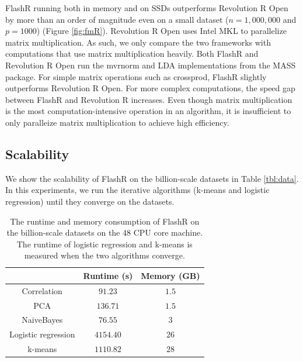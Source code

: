 FlashR running both in memory and on SSDs outperforms Revolution R Open by more
than an order of magnitude even on a small dataset ($n=1,000,000$ and $p=1000$)
(Figure \ref{fig:fmR}).
Revolution R Open uses Intel MKL to parallelize matrix multiplication. As such,
we only compare the two frameworks with computations that use matrix
multiplication heavily. Both FlashR and Revolution R Open run the mvrnorm
and LDA implementations from the MASS package. For simple matrix operations such as crossprod,
FlashR slightly outperforms Revolution R Open. For more complex computations,
the speed gap between FlashR and Revolution R increases. Even though matrix multiplication
is the most computation-intensive operation in an algorithm, it is insufficient
to only paralleize matrix multiplication to achieve high efficiency.

\subsection{Scalability}

We show the scalability of FlashR on the billion-scale datasets in Table
\ref{tbl:data}. In this experiments, we run the iterative algorithms
(k-means and logistic regression) until they converge on the datasets.

\begin{table}
\begin{center}
\footnotesize
\begin{tabular}{|c|c|c|}
\hline
	& Runtime (s) & Memory (GB) \\
\hline
Correlation & $91.23$ & $1.5$ \\
\hline
PCA & $136.71$ & $1.5$ \\
\hline
NaiveBayes & $76.55$ & $3$ \\
\hline
Logistic regression & $4154.40$ & $26$ \\
\hline
k-means & $1110.82$ & $28$ \\
\hline
\end{tabular}
\normalsize
\end{center}
\caption{The runtime and memory consumption of FlashR on the billion-scale
	datasets on the 48 CPU core machine. The runtime of logistic regression
	and k-means is measured when the two algorithms converge.}
\label{tbl:scale}
\end{table}

